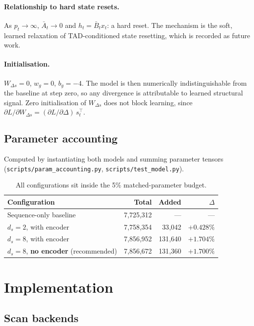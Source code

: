 \documentclass[11pt,a4paper]{article}
\newcommand{\code}[1]{\texttt{\small #1}}
\begin{document}
\paragraph{Relationship to hard state resets.} As $p_t \to \infty$,
$\bar{A}_t \to 0$ and $h_t = \bar{B}_t x_t$: a hard reset. The mechanism is the
soft, learned relaxation of TAD-conditioned state resetting, which is recorded as
future work.

\paragraph{Initialisation.} $W_{\Delta s} = 0$, $w_g = 0$, $b_g = -4$. The model
is then numerically indistinguishable from the baseline at step zero, so any
divergence is attributable to learned structural signal. Zero initialisation of
$W_{\Delta s}$ does not block learning, since
$\partial L/\partial W_{\Delta s} = (\partial L/\partial \Delta)\, s_t^{\top}$.

\subsection{Parameter accounting}

Computed by instantiating both models and summing parameter tensors
(\code{scripts/param\_accounting.py}, \code{scripts/test\_model.py}).

\begin{table}[h]\centering
\begin{tabular}{@{}lrrr@{}}
\toprule
Configuration & Total & Added & $\Delta$ \\
\midrule
Sequence-only baseline & 7{,}725{,}312 & --- & --- \\
$d_s=2$, with encoder & 7{,}758{,}354 & 33{,}042 & $+0.428\%$ \\
$d_s=8$, with encoder & 7{,}856{,}952 & 131{,}640 & $+1.704\%$ \\
$d_s=8$, \textbf{no encoder} (recommended) & 7{,}856{,}672 & 131{,}360 & $+1.700\%$ \\
\bottomrule
\end{tabular}
\caption{All configurations sit inside the 5\% matched-parameter budget.}
\end{table}

\section{Implementation}

\subsection{Scan backends}
\end{document}
